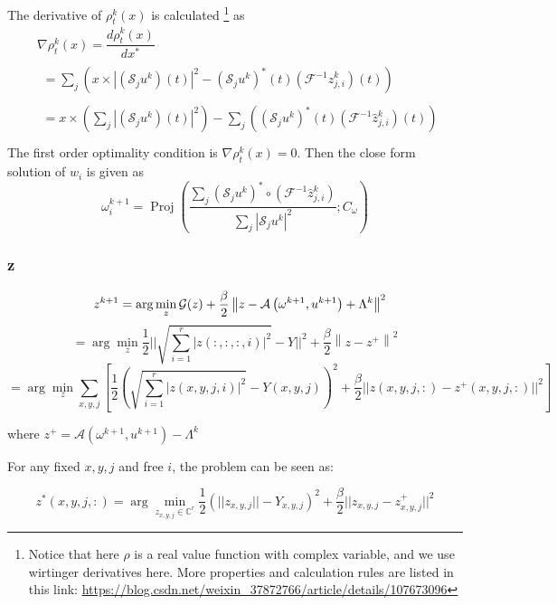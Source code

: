 \documentclass{article}
\numberwithin{equation}{section}
\begin{document}
The derivative of $\rho_{t}^{k}(x)$ is calculated 
\footnote{Notice that here $\rho$ is a real value function with complex variable, and we use wirtinger derivatives here. More properties and calculation rules are listed in this link: \url{https://blog.csdn.net/weixin_37872766/article/details/107673096}} as
$$
\begin{aligned}
&\nabla \rho_{t}^{k}(x) = \dfrac{ d\rho_{t}^{k}(x)}{dx^*} \\
&\begin{aligned}
=\sum_{j}\left(x \times\left|\left(\mathcal{S}_{j} u^{k}\right)(t)\right|^{2}-\left(\mathcal{S}_{j} u^{k}\right)^{*}(t)\left(\mathcal{F}^{-1} \hat{z}_{j,i}^{k}\right)(t)\right)
\end{aligned} \\
&\begin{aligned}
=x \times\left(\sum_{j}\left|\left(\mathcal{S}_{j} u^{k}\right)(t)\right|^{2}\right)-\sum_{j}\left(\left(\mathcal{S}_{j} u^{k}\right)^{*}(t)\left(\mathcal{F}^{-1} \hat{z}_{j,i}^{k}\right)(t)\right) \\
\end{aligned}
\end{aligned}
$$
The first order optimality condition is $\nabla \rho_{t}^{k}(x)=0 $. Then the close form solution of $w_i$ is given as
$$
\omega_i^{k+1}=\operatorname{Proj}\left(\frac{ \sum_{j}\left(\mathcal{S}_{j} u^{k}\right)^{*} \circ\left(\mathcal{F}^{-1} \hat{z}_{j,i}^{k}\right)}{ \sum_{j}\left|\mathcal{S}_{j} u^{k}\right|^{2}} ; C_{\omega}\right)
$$

 \subsubsection{z}
 $$
  \quad z^{k+1}=\arg \min _{z} \mathcal{G}(z)+\frac{\beta}{2}\left\|z-\mathcal{A}\left(\omega^{k+1}, u^{k+1}\right)+\Lambda^{k}\right\|^{2}\\
  $$
  $$
  =\arg \min _{z} \frac{1}{2}|| \sqrt{ \sum_{i=1}^{r} |z(:,:,:,i)|^2} - Y||^2+\frac{\beta}{2}\left\|z - z^+\right\|^{2}
 $$
 $$
 = \arg \min _{z} \sum_{x,y,j} [\frac{1}{2} ( \sqrt{ \sum_{i=1}^{r} |z(x,y,j,i)|^2} - Y(x,y,j) )^2 +
  \frac{\beta}{2}||z(x,y,j,:) - z^+(x,y,j,:)||^2 ]
 $$
 
 where $z^+ = \mathcal{A}\left(\omega^{k+1}, u^{k+1}\right) - \Lambda^{k}$
 
 For any fixed $x,y,j$ and free $i$, the problem can be seen as:
 
 $$
 z^*(x,y,j,:) = \arg \min_{z_{x,y,j} \in \mathbb{C}^{r}} \frac{1}{2} ( ||z_{x,y,j}|| - Y_{x,y,j} )^2
 + \frac{\beta}{2} ||z_{x,y,j} - z_{x,y,j}^+||^2
 $$
 
\end{document}
